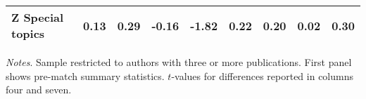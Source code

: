 \begin{table}[H]
\begin{adjustwidth}{-0.6cm}{}
\begin{threeparttable}
\begin{tabular}{p{3.55cm}S@{}S@{}S@{}S@{}S@{}S@{}S@{}S@{}}
            \quad Z Special topics&        0.13&        0.29&       -0.16&       -1.82&        0.22&        0.20&        0.02&        0.30\\
            \bottomrule
        \end{tabular}
        \begin{tablenotes}
            \tiny
            \item \textit{Notes}. Sample restricted to authors with three or more publications. First panel shows pre-match summary statistics. \(t\)-values for differences reported in columns four and seven.
        \end{tablenotes}
    \end{threeparttable}
    \end{adjustwidth}
\end{table}
